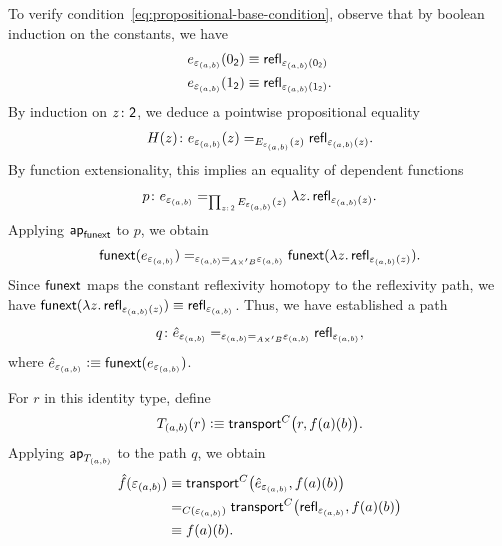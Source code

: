 \begin{solution}
    To verify condition~\eqref{eq:propositional-base-condition}, observe that by boolean induction on the constants, we have
    \begin{align*}
        e_{\varepsilon_{(a,b)}}(0_{\mathsf{2}})
            &\equiv\mathsf{refl}_{\varepsilon_{(a,b)}(0_{\mathsf{2}})}\\
        e_{\varepsilon_{(a,b)}}(1_{\mathsf{2}})
            &\equiv\mathsf{refl}_{\varepsilon_{(a,b)}(1_{\mathsf{2}})}.
    \end{align*}
    By induction on $z\colon\fun2$, we deduce a pointwise propositional equality
    \[
        H(z)\colon e_{\varepsilon_{(a,b)}}(z)
        \eq{E_{\varepsilon_{(a,b)}}(z)}
        \fun{refl}_{\varepsilon_{(a,b)}(z)}.
    \]
    By function extensionality, this implies an equality of dependent functions
    \[
        p\colon e_{\varepsilon_{(a,b)}}
        \eq{\prod_{z\colon\fun2}E_{\varepsilon_{(a,b)}}(z)}
        \lambda z.\,\fun{refl}_{\varepsilon_{(a,b)}(z)}.
    \]
    Applying $\mathsf{ap}_{\mathsf{funext}}$ to $p$, we obtain
    \[
        \mathsf{funext}(e_{\varepsilon_{(a,b)}})
        \mathrel{=_{\varepsilon_{(a,b)}\mathrel{=_{A\times'B}}\varepsilon_{(a,b)}}}
        \mathsf{funext}(\lambda z.\,\mathsf{refl}_{\varepsilon_{(a,b)}(z)}).
    \]
    Since $\mathsf{funext}$ maps the constant reflexivity homotopy to the reflexivity path, we have $\mathsf{funext}(\lambda z.\,\mathsf{refl}_{\varepsilon_{(a,b)}(z)})\equiv\mathsf{refl}_{\varepsilon_{(a,b)}}$. Thus, we have established a path
    \[
        q\colon\hat e_{\varepsilon_{(a,b)}}
        \eq{\varepsilon_{(a,b)}\eq{A\times'B}\varepsilon_{(a,b)}}
        \fun{refl}_{\varepsilon_{(a,b)}},
    \]
    where $\hat e_{\varepsilon_{(a,b)}}\mathrel{\vcentcolon}\equiv\mathsf{funext}(e_{\varepsilon_{(a,b)}})$.
    
    For $r$ in this identity type, define
    \[
        T_{(a,b)}(r)\mathrel{\vcentcolon}\equiv\mathsf{transport}^C
            \bigl(
                r,f(a)(b)
            \bigr).
    \]
    Applying $\mathsf{ap}_{T_{(a,b)}}$ to the path $q$, we obtain
    \begin{align*}
        \hat f(\varepsilon_{(a,b)})
            &\equiv\mathsf{transport}^C
                \bigl(
                    \hat e_{\varepsilon_{(a,b)}},
                    f(a)(b)
                \bigr)\\
            &\mathrel{=_{C(\varepsilon_{(a,b)})}}
                \mathsf{transport}^C
                \bigl(
                    \mathsf{refl}_{\varepsilon_{(a,b)}},
                    f(a)(b)
                \bigr)\\
            &\equiv f(a)(b).
    \end{align*}
\end{solution}

